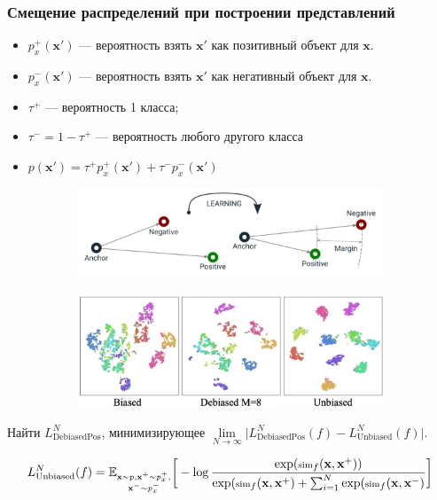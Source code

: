 \documentclass[
	11pt, %
	t, %
        russian
]{beamer}
\begin{document}
\begin{frame}
    \frametitle{Смещение распределений при построении представлений}
\footnotesize
\begin{itemize}
    \item $p^+_x(\mathbf{x'})$ — вероятность взять $\mathbf{x'}$ как позитивный объект для $\mathbf{x}$.
    \item $p^-_x(\mathbf{x'})$ — вероятность взять $\mathbf{x'}$ как негативный объект для $\mathbf{x}$.
    \item $\tau^+$ — вероятность 1 класса;
    \item $\tau^- = 1 - \tau^+$ — вероятность любого другого класса
    \item $p(\mathbf{x'}) = \tau^+ p_x^+(\mathbf{x'}) + \tau^-p_x^-(\mathbf{x'})$
\end{itemize}

\begin{figure}
\centering
\begin{subfigure}
  \centering
  \includegraphics[width=.4\linewidth]{Images/triplet.jpeg}
  \label{fig:sub1}
\end{subfigure}%
\begin{subfigure}
  \centering
  \includegraphics[width=.5\linewidth]{Images/t-SNE.jpeg}
  \label{fig:sub2}
\end{subfigure}
\label{fig:test}
\end{figure}

Найти $L_{\text{DebiasedPos}}^N$, минимизирующее $\lim \limits_{N \to \infty} \big|L_{\text{DebiasedPos}}^N (f)  - L_{\text{Unbiased}}^N(f)\big|$.

\begin{equation*} \small
L_{\text{Unbiased}}^N(f) = \mathbb{E}_{\substack{\mathbf{x} \sim p, \mathbf{x^+} \sim p^+_x,\\ \mathbf{x^-} \sim p_x^-}} \bigg[-\log \frac{\exp (\scriptsize\text{sim}_f(\mathbf{x}, \mathbf{x^+}))}{\exp (\scriptsize\text{sim}_f(\mathbf{x}, \mathbf{x^+}) + \sum _{i=1}^N \exp (\scriptsize\text{sim}_f(\mathbf{x}, \mathbf{x^-})}\bigg]
\end{equation*}

\end{frame}
\end{document}
